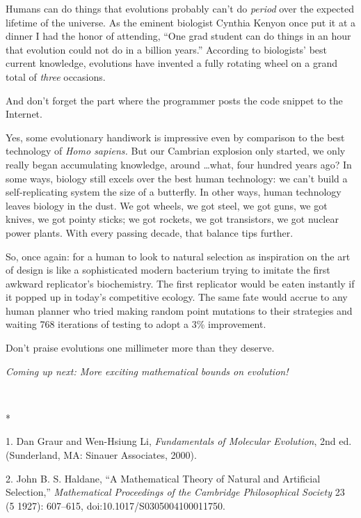{
 Humans can do things that evolutions probably
can't do \textit{period} over the expected lifetime of
the universe. As the eminent biologist Cynthia Kenyon once put it at a
dinner I had the honor of attending, ``One grad
student can do things in an hour that evolution could not do in a
billion years.'' According to
biologists' best current knowledge, evolutions have
invented a fully rotating wheel on a grand total of \textit{three}
occasions.}

{
 And don't forget the part where the programmer
posts the code snippet to the Internet.}

{
 Yes, some evolutionary handiwork is impressive even by comparison
to the best technology of \textit{Homo sapiens.} But our Cambrian
explosion only started, we only really began accumulating knowledge,
around \ldots what, four hundred years ago? In some ways, biology still
excels over the best human technology: we can't build a
self-replicating system the size of a butterfly. In other ways, human
technology leaves biology in the dust. We got wheels, we got steel, we
got guns, we got knives, we got pointy sticks; we got rockets, we got
transistors, we got nuclear power plants. With every passing decade,
that balance tips further.}

{
 So, once again: for a human to look to natural selection as
inspiration on the art of design is like a sophisticated modern
bacterium trying to imitate the first awkward
replicator's biochemistry. The first replicator would
be eaten instantly if it popped up in today's
competitive ecology. The same fate would accrue to any human planner
who tried making random point mutations to their strategies and waiting
768 iterations of testing to adopt a 3\% improvement.}

{
 Don't praise evolutions one millimeter more than
they deserve.}

{
 \textit{Coming up next: More exciting mathematical bounds on
evolution!}}

{\centering
 \ ~
\par}

{\centering
 *
\par}


\bigskip

{
 1. Dan Graur and Wen-Hsiung Li, \textit{Fundamentals of Molecular
Evolution}, 2nd ed. (Sunderland, MA: Sinauer Associates, 2000).}

{
 2. John B. S. Haldane, ``A Mathematical Theory of
Natural and Artificial Selection,''
\textit{Mathematical Proceedings of the Cambridge Philosophical
Society} 23 (5 1927): 607--615, doi:10.1017/S0305004100011750.}

